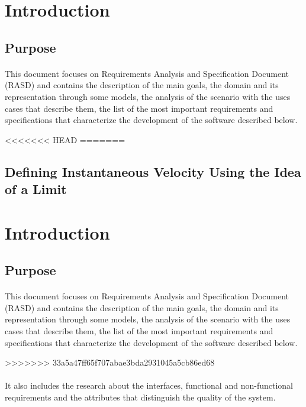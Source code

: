 \section{Introduction}
\subsection{Purpose}
\paragraph{}
This document focuses on Requirements Analysis and Specification Document (RASD) and contains the description of the main goals, the domain and its representation through some models, the analysis of the scenario with the uses cases that describe them, the list of the most important requirements and specifications that characterize the development of the software described below.

<<<<<<< HEAD
=======
\subsection{Defining Instantaneous Velocity Using the Idea of a Limit}
\vfill
\section{Introduction}
\subsection{Purpose}
\paragraph{}
This document focuses on Requirements Analysis and Specification Document (RASD) and contains the description of the main goals, the domain and its representation through some models, the analysis of the scenario with the uses cases that describe them, the list of the most important requirements and specifications that characterize the development of the software described below.

>>>>>>> 33a5a47ff65f707abae3bda2931045a5cb86ed68
\paragraph{}
It also includes the research about the interfaces, functional and non-functional requirements and the attributes that distinguish the quality of the system.

